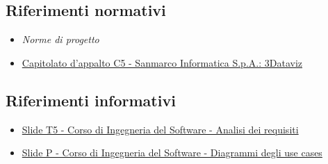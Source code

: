 \subsection{Riferimenti normativi}
\begin{itemize}
      \item {\textit{Norme di progetto}}
      \item \href{https://www.math.unipd.it/~tullio/IS-1/2024/Progetto/C5.pdf}
            {Capitolato d'appalto C5 - Sanmarco Informatica S.p.A.: 3Dataviz}
\end{itemize}

\subsection{Riferimenti informativi}
\begin{itemize}
      \item \href{https://www.math.unipd.it/~tullio/IS-1/2024/Dispense/T05.pdf}
            {Slide T5 - Corso di Ingegneria del Software - Analisi dei requisiti}
      \item \href{https://www.math.unipd.it/~rcardin/swea/2022/Diagrammi\%20Use\%20Case.pdf}
            {Slide P - Corso di Ingegneria del Software - Diagrammi degli use cases}
\end{itemize}
